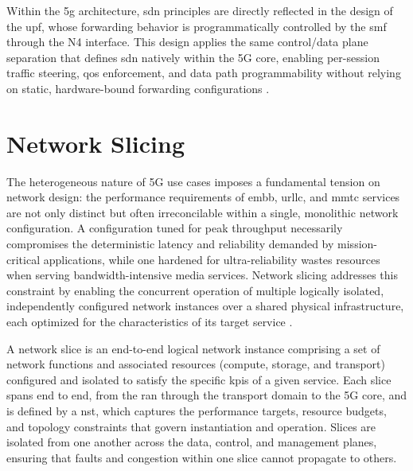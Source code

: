 Within the \ac{5g} architecture, \ac{sdn} principles are directly reflected in the design of the \ac{upf}, whose forwarding behavior is programmatically controlled by the \ac{smf} through the N4 interface. This design applies the same control/data plane separation that defines \ac{sdn} natively within the 5G core, enabling per-session traffic steering, \ac{qos} enforcement, and data path programmability without relying on static, hardware-bound forwarding configurations \cite{3GPP5GSystemarchitecture5GSystem2026}.


\section{Network Slicing}

The heterogeneous nature of 5G use cases imposes a fundamental tension on network design: the performance requirements of \ac{embb}, \ac{urllc}, and \ac{mmtc} services are not only distinct but often irreconcilable within a single, monolithic network configuration. A configuration tuned for peak throughput necessarily compromises the deterministic latency and reliability demanded by mission-critical applications, while one hardened for ultra-reliability wastes resources when serving bandwidth-intensive media services. Network slicing addresses this constraint by enabling the concurrent operation of multiple logically isolated, independently configured network instances over a shared physical infrastructure, each optimized for the characteristics of its target service \cite{zhang2017NetworkSlicingBaseda}.

A network slice is an end-to-end logical network instance comprising a set of network functions and associated resources (compute, storage, and transport) configured and isolated to satisfy the specific \acp{kpi} of a given service. Each slice spans end to end, from the \ac{ran} through the transport domain to the 5G core, and is defined by a \ac{nst}, which captures the performance targets, resource budgets, and topology constraints that govern instantiation and operation. Slices are isolated from one another across the data, control, and management planes, ensuring that faults and congestion within one slice cannot propagate to others.

